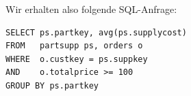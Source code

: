 Wir erhalten also folgende SQL-Anfrage:

\begin{lstlisting}[mathescape]
SELECT ps.partkey, avg(ps.supplycost)
FROM   partsupp ps, orders o
WHERE  o.custkey = ps.suppkey 
AND    o.totalprice >= 100
GROUP BY ps.partkey
\end{lstlisting}



%
%
%




